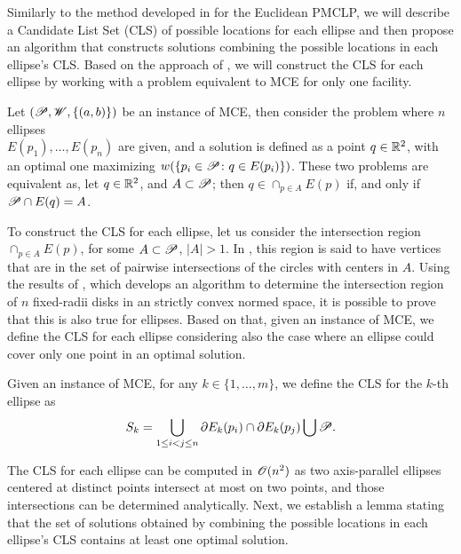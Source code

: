 Similarly to the method developed in \cite{church:1984} for the Euclidean PMCLP, we will describe a Candidate List Set (CLS) of possible locations for each ellipse and then propose an algorithm that constructs solutions combining the possible locations in each ellipse's CLS.
Based on the approach of \cite{chazelle:1986,cabello:2006}, we will construct the CLS for each ellipse by working with a problem equivalent to MCE for only one facility.

Let $(\mathscr{P}, \mathscr{W}, \{(a, b)\})$ be an instance of MCE, then consider the problem where $n$ ellipses\\ $E(p_1), \dots, E(p_n)$ are given, and a solution is defined as a point $q\in\mathbb{R}^2$, with an optimal one maximizing 
$w(\{p_i\in\mathscr{P} \colon q\in E(p_i)\})$.
These two problems are equivalent as, let $q\in\mathbb{R}^2$, and $A\subset\mathscr{P}$; then $q\in\cap_{p\in A}E(p)$ if, and only if $\mathscr{P} \cap E(q) = A$.

To construct the CLS for each ellipse, let us consider the intersection region $\cap_{p\in A} E(p)$, for some $A\subset \mathscr{P}$, $|A|>1$. In \cite{church:1984}, this region 
is said to have vertices that are in the set of pairwise intersections of the circles with centers in $A$.
Using the results of \cite{bi}, which develops an algorithm to determine the intersection region of $n$ fixed-radii disks in an strictly convex normed space, it is possible to prove that this is also true for ellipses. Based on that, given an instance of MCE, we define the CLS for each ellipse considering also the case where an ellipse could cover only one point in an optimal solution.

\begin{definition}\label{def:cls_mce}
	Given an instance of MCE, for any $k \in \{1, \dots, m\}$, we define the CLS for the $k$-th ellipse as
	\begin{equation}
	S_k = \bigcup_{1 \le i < j \le n} \partial E_k(p_i) \cap \partial E_k(p_j) \bigcup \mathscr{P}.
	\end{equation}
\end{definition}

The CLS for each ellipse can be computed in $\mathscr{O}(n^2)$ as two axis-parallel ellipses centered at distinct points intersect at most on two points, and those intersections can be determined analytically. Next, we establish a lemma stating that the set of solutions obtained by combining the possible locations in each ellipse's CLS contains at least one optimal solution.

